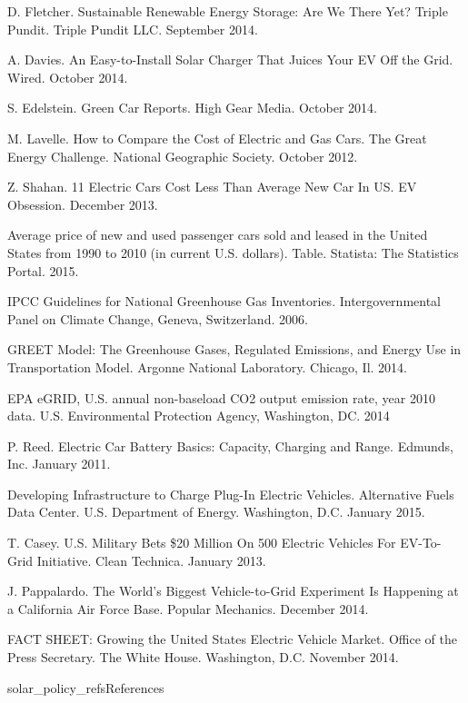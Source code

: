\begin{thebibliography}{99}
 D. Fletcher. Sustainable Renewable Energy Storage: Are We There Yet? Triple Pundit. Triple Pundit LLC. September 2014.



 A. Davies. An Easy-to-Install Solar Charger That Juices Your EV Off the Grid. Wired. October 2014.

 S. Edelstein. Green Car Reports. High Gear Media. October 2014.

 M. Lavelle. How to Compare the Cost of Electric and Gas Cars. The Great Energy Challenge. National Geographic Society. October 2012.

 Z. Shahan. 11 Electric Cars Cost Less Than Average New Car In US. EV Obsession. December 2013.

 Average price of new and used passenger cars sold and leased in the United States from 1990 to 2010 (in current U.S. dollars). Table. Statista: The Statistics Portal. 2015.

 IPCC Guidelines for National Greenhouse Gas Inventories. Intergovernmental Panel on Climate Change, Geneva, Switzerland. 2006.


 GREET Model: The Greenhouse Gases, Regulated Emissions, and Energy Use in Transportation Model. Argonne National Laboratory. Chicago, Il. 2014.

 EPA  eGRID, U.S. annual non-baseload CO2 output emission rate, year 2010 data. U.S. Environmental Protection Agency, Washington, DC. 2014

 P. Reed. Electric Car Battery Basics: Capacity, Charging and Range. Edmunds, Inc. January 2011.

 Developing Infrastructure to Charge Plug-In Electric Vehicles. Alternative Fuels Data Center. U.S. Department of Energy. Washington, D.C. January 2015.

 T. Casey. U.S. Military Bets \$20 Million On 500 Electric Vehicles For EV-To-Grid Initiative. Clean Technica. January 2013.

 J. Pappalardo. The World's Biggest Vehicle-to-Grid Experiment Is Happening at a California Air Force Base. Popular Mechanics. December 2014.

 FACT SHEET: Growing the United States Electric Vehicle Market. Office of the Press Secretary. The White House. Washington, D.C. November 2014.





\end{thebibliography}

{solar_policy_refs}{References}
